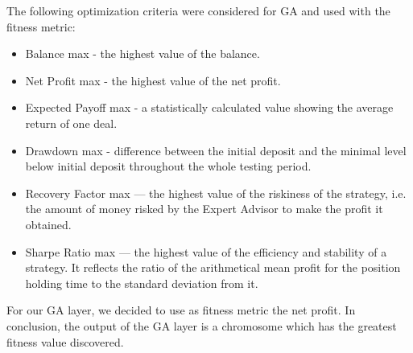 The following optimization criteria were considered for GA and used with the fitness metric:
\begin{itemize}
\setlength\itemsep{0.3em}
\item Balance max - the highest value of the balance.
\item Net Profit max - the highest value of the net profit.
\item Expected Payoff max - a statistically calculated value showing the average return of one deal.
\item Drawdown max - difference between the initial deposit and the minimal level below initial deposit throughout the whole testing period.
\item Recovery Factor max — the highest value of the riskiness of the strategy, i.e. the amount of money risked by the Expert Advisor to make the profit it obtained.
\item Sharpe Ratio max — the highest value of the efficiency and stability of a strategy. It reflects the ratio of the arithmetical mean profit for the position holding time to the standard deviation from it.
\end{itemize}

For our GA layer, we decided to use as fitness metric the net profit.
In conclusion, the output of the GA layer is a chromosome which has the greatest fitness value discovered.
